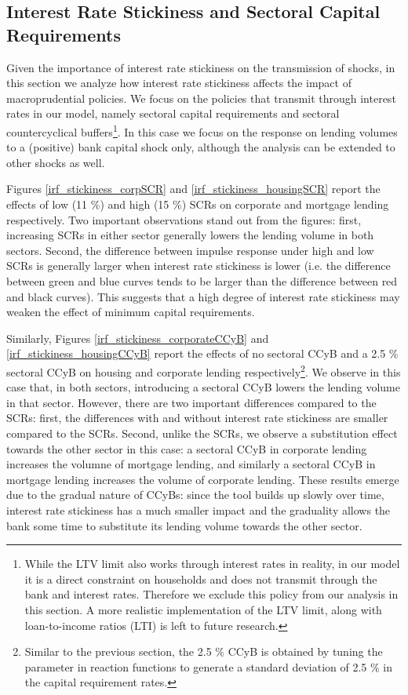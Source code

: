 \documentclass[12pt]{article}
\numberwithin{equation}{section}
\begin{document}
\subsection{Interest Rate Stickiness and Sectoral Capital Requirements}

Given the importance of interest rate stickiness on the transmission of shocks, in this section we analyze how interest rate stickiness affects the impact of macroprudential policies. We focus on the policies that transmit through interest rates in our model, namely sectoral capital requirements and sectoral countercyclical buffers\footnote{While the LTV limit also works through interest rates in reality, in our model it is a direct constraint on households and does not transmit through the bank and interest rates. Therefore we exclude this policy from our analysis in this section. A more realistic implementation of the LTV limit, along with loan-to-income ratios (LTI) is left to future research.}. In this case we focus on the response on lending volumes to a (positive) bank capital shock only, although the analysis can be extended to other shocks as well. 

Figures \ref{irf_stickiness_corpSCR} and \ref{irf_stickiness_housingSCR} report the effects of low (11 \%) and high (15 \%) SCRs on corporate and mortgage lending respectively. Two important observations stand out from the figures: first, increasing SCRs in either sector generally lowers the lending volume in both sectors. Second, the difference between impulse response under high and low SCRs is generally larger when interest rate stickiness is lower (i.e. the difference between green and blue curves tends to be larger than the difference between red and black curves). This suggests that a high degree of interest rate stickiness may weaken the effect of minimum capital requirements. 

Similarly, Figures \ref{irf_stickiness_corporateCCyB} and \ref{irf_stickiness_housingCCyB} report the effects of no sectoral CCyB and a 2.5 \% sectoral CCyB on housing and corporate lending respectively\footnote{Similar to the previous section, the 2.5 \% CCyB is obtained by tuning the parameter in reaction functions to generate a standard deviation of 2.5 \% in the capital requirement rates.}. We observe in this case that, in both sectors, introducing a sectoral CCyB lowers the lending volume in that sector. However, there are two important differences compared to the SCRs: first, the differences with and without interest rate stickiness are smaller compared to the SCRs. Second, unlike the SCRs, we observe a substitution effect towards the other sector in this case: a sectoral CCyB in corporate lending increases the volumne of mortgage lending, and similarly a sectoral CCyB in mortgage lending increases the volume of corporate lending. These results emerge due to the gradual nature of CCyBs: since the tool builds up slowly over time, interest rate stickiness has a much smaller impact and the graduality allows the bank some time to substitute its lending volume towards the other sector. 
\end{document}
